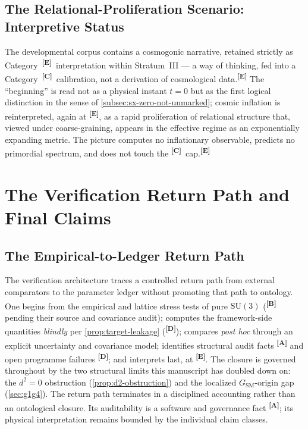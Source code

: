 \documentclass[12pt,a4paper,twoside]{article}
\theoremstyle{plain}
\theoremstyle{definition}
\theoremstyle{remark}
\newcommand{\catmark}[1]{\textsuperscript{\textsf{\textbf{[#1]}}}}
\begin{document}
\subsection{The Relational-Proliferation Scenario: Interpretive Status}
\label{subsec:information-big-bang}

The developmental corpus contains a cosmogonic narrative, retained
strictly as Category~\catmark{E}\ interpretation within Stratum~III ---
a way of thinking, fed into a Category~\catmark{C}\ calibration, not a
derivation of cosmological data.\catmark{E} The ``beginning'' is read
not as a physical instant $t=0$ but as the first logical distinction in
the sense of \cref{subsec:sx-zero-not-unmarked}; cosmic inflation is
reinterpreted, again at \catmark{E}, as a rapid proliferation of
relational structure that, viewed under coarse-graining, appears in the
effective regime as an exponentially expanding metric. The picture
computes no inflationary observable, predicts no primordial spectrum,
and does not touch the \catmark{C}\ cap.\catmark{E}

\section{The Verification Return Path and Final Claims}
\label{sec:closed-circle}

\subsection{The Empirical-to-Ledger Return Path}
\label{subsec:return-path}

The verification architecture traces a controlled return path from external
comparators to the parameter ledger without promoting that path to ontology. One begins from the empirical and lattice stress
tests of pure $\mathrm{SU}(3)$ (\catmark{B}\,pending their source and
covariance audit); computes the framework-side quantities \emph{blindly}
per \cref{prop:target-leakage} (\catmark{D}); compares \emph{post hoc}
through an explicit uncertainty and covariance model; identifies structural audit facts \catmark{A} and open programme failures
\catmark{D}; and interprets last, at \catmark{E}. The closure is governed throughout by the two structural
limits this manuscript has doubled down on: the $d^2=0$ obstruction
(\cref{prop:d2-obstruction}) and the localized
$G_{\mathrm{SM}}$-origin gap (\cref{sec:g1g4}). The return path terminates in a disciplined accounting rather than an
ontological closure. Its auditability is a software and governance fact
\catmark{A}; its physical interpretation remains bounded by the individual
claim classes.
\end{document}
